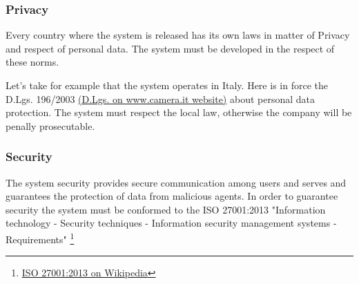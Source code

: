 \documentclass[english]{article}
\begin{document}
		\subsubsection{Privacy}
		Every country where the system is released has its own laws in matter of Privacy and respect of personal data. The system must be developed in the respect of these norms.\par Let's take for example that the system operates in Italy. Here is in force the D.Lgs. 196/2003 \href{http://www.camera.it/parlam/leggi/deleghe/03196dl.htm}{(D.Lgs. on www.camera.it website)} about personal data protection. The system must respect the local law, otherwise the company will be penally prosecutable.
		\subsubsection{Security}
		The system security provides secure communication among users and serves and guarantees the protection of data from malicious agents. In order to guarantee security the system must be conformed to the ISO 27001:2013 "Information technology - Security techniques - Information security management systems - Requirements" \footnote{\href{https://en.wikipedia.org/wiki/ISO/IEC_27001:2013}{ISO 27001:2013 on Wikipedia}}
\end{document}
